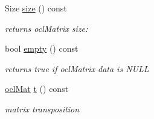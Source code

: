 \begin{DoxyCompactItemize}
Size \hyperlink{classcv_1_1ocl_1_1oclMat_a21384709f0d43efd26d0c70edc7adf8a}{size} () const 
\begin{DoxyCompactList}\small\item\em returns ocl\-Matrix size\-: \end{DoxyCompactList}\item 
bool \hyperlink{classcv_1_1ocl_1_1oclMat_a2a50eb2fc7a2b44041708abab9b6ec9f}{empty} () const 
\begin{DoxyCompactList}\small\item\em returns true if ocl\-Matrix data is N\-U\-L\-L \end{DoxyCompactList}\item 
\hyperlink{classcv_1_1ocl_1_1oclMat}{ocl\-Mat} \hyperlink{classcv_1_1ocl_1_1oclMat_a95e16f4d80e664e581b194d27b47204d}{t} () const 
\begin{DoxyCompactList}\small\item\em matrix transposition \end{DoxyCompactList}\end{DoxyCompactItemize}

